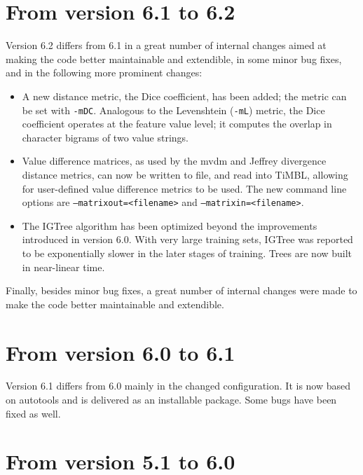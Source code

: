 \documentclass{report}
\begin{document}
\section{From version 6.1 to 6.2}

Version 6.2 differs from 6.1 in a great number of internal changes
aimed at making the code better maintainable and extendible, in some
minor bug fixes, and in the following more prominent changes:

\begin{itemize}

\item A new distance metric, the Dice coefficient, has been added; the
  metric can be set with {\tt -mDC}. Analogous to the Levenshtein
  ({\tt -mL}) metric, the Dice coefficient operates at the feature
  value level; it computes the overlap in character bigrams of two
  value strings.

\item Value difference matrices, as used by the {\sc mvdm} and Jeffrey
  divergence distance metrics, can now be written to file, and read
  into TiMBL, allowing for user-defined value difference metrics to be
  used. The new command line options are {\tt --matrixout=<filename>}
  and {\tt --matrixin=<filename>}.

\item The {\sc IGTree} algorithm has been optimized beyond the
  improvements introduced in version 6.0. With very large training
  sets, {\sc IGTree} was reported to be exponentially slower in the
  later stages of training. Trees are now built in near-linear time.

\end{itemize}

Finally, besides minor bug fixes, a great number of internal changes
were made to make the code better maintainable and extendible.

\section{From version 6.0 to 6.1}

Version 6.1 differs from 6.0 mainly in the changed configuration.  It
is now based on autotools and is delivered as an installable package.
Some bugs have been fixed as well.

\section{From version 5.1 to 6.0}
\end{document}
